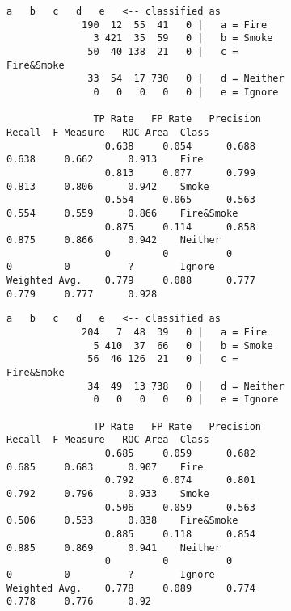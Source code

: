 \clearpage
\begin{figure}[h]
\ContinuedFloat 
\renewcommand{\thesubfigure}{\arabic{subfigure}}

    \begin{subfigure}[b]{\textwidth}
    \caption{}
    \label{fig:cmatrix04}
    \begin{lstlisting}[language={}, basicstyle=\footnotesize, frame=none, basewidth=0.45em]
			   a   b   c   d   e   <-- classified as
			 190  12  55  41   0 |   a = Fire
			   3 421  35  59   0 |   b = Smoke
			  50  40 138  21   0 |   c = Fire&Smoke
			  33  54  17 730   0 |   d = Neither
			   0   0   0   0   0 |   e = Ignore

               TP Rate   FP Rate   Precision   Recall  F-Measure   ROC Area  Class
                 0.638     0.054      0.688     0.638     0.662      0.913    Fire
                 0.813     0.077      0.799     0.813     0.806      0.942    Smoke
                 0.554     0.065      0.563     0.554     0.559      0.866    Fire&Smoke
                 0.875     0.114      0.858     0.875     0.866      0.942    Neither
                 0         0          0         0         0          ?        Ignore
Weighted Avg.    0.779     0.088      0.777     0.779     0.777      0.928
    \end{lstlisting}
    \end{subfigure}


    \begin{subfigure}[b]{\textwidth}
    \caption{}
    \label{fig:cmatrix05}
    \begin{lstlisting}[language={}, basicstyle=\footnotesize, frame=none, basewidth=0.45em]
			   a   b   c   d   e   <-- classified as
			 204   7  48  39   0 |   a = Fire
			   5 410  37  66   0 |   b = Smoke
			  56  46 126  21   0 |   c = Fire&Smoke
			  34  49  13 738   0 |   d = Neither
			   0   0   0   0   0 |   e = Ignore

               TP Rate   FP Rate   Precision   Recall  F-Measure   ROC Area  Class
                 0.685     0.059      0.682     0.685     0.683      0.907    Fire
                 0.792     0.074      0.801     0.792     0.796      0.933    Smoke
                 0.506     0.059      0.563     0.506     0.533      0.838    Fire&Smoke
                 0.885     0.118      0.854     0.885     0.869      0.941    Neither
                 0         0          0         0         0          ?        Ignore
Weighted Avg.    0.778     0.089      0.774     0.778     0.776      0.92 
    \end{lstlisting}
    \end{subfigure}



\end{figure}
